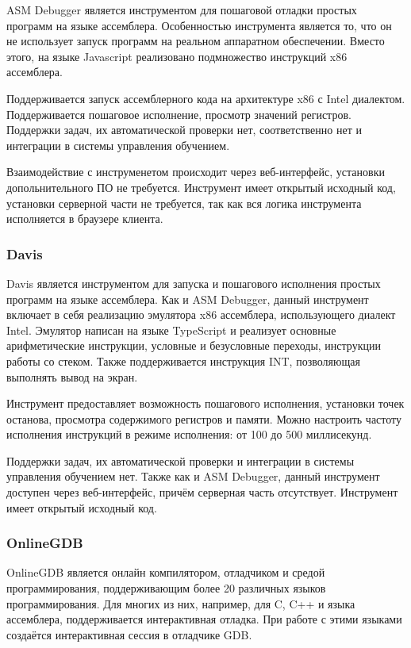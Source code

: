 \documentclass[a4paper,article,14pt]{extarticle}
\begin{document}
ASM Debugger\cite{asmdebugger} является инструментом для пошаговой отладки простых программ на языке ассемблера. Особенностью инструмента является то, что он не использует запуск программ на реальном аппаратном обеспечении. Вместо этого, на языке Javascript реализовано подмножество инструкций x86 ассемблера.

Поддерживается запуск ассемблерного кода на архитектуре x86 с Intel диалектом. Поддерживается пошаговое исполнение, просмотр значений регистров. Поддержки задач, их автоматической проверки нет, соответственно нет и интеграции в системы управления обучением.

Взаимодействие с инструменетом происходит через веб-интерфейс, установки допольнительного ПО не требуется. Инструмент имеет открытый исходный код, установки серверной части не требуется, так как вся логика инструмента исполняется в браузере клиента.

\subsubsection{Davis}

Davis\cite{davis} является инструментом для запуска и пошагового исполнения простых программ на языке ассемблера. Как и ASM Debugger, данный инструмент включает в себя реализацию эмулятора x86 ассемблера, использующего диалект Intel. Эмулятор написан на языке TypeScript и реализует основные арифметические инструкции, условные и безусловные переходы, инструкции работы со стеком. Также поддерживается инструкция INT, позволяющая выполнять вывод на экран.

Инструмент предоставляет возможность пошагового исполнения, установки точек останова, просмотра содержимого регистров и памяти. Можно настроить частоту исполнения инструкций в режиме исполнения: от 100 до 500 миллисекунд.

Поддержки задач, их автоматической проверки и интеграции в системы управления обучением нет. Также как и ASM Debugger, данный инструмент доступен через веб-интерфейс, причём серверная часть отсутствует. Инструмент имеет открытый исходный код.

\subsubsection{OnlineGDB}

OnlineGDB\cite{onlinegdb} является онлайн компилятором, отладчиком и средой программирования, поддерживающим более 20 различных языков программирования. Для многих из них, например, для C, C++ и языка ассемблера, поддерживается интерактивная отладка. При работе с этими языками создаётся интерактивная сессия в отладчике GDB.
\end{document}
